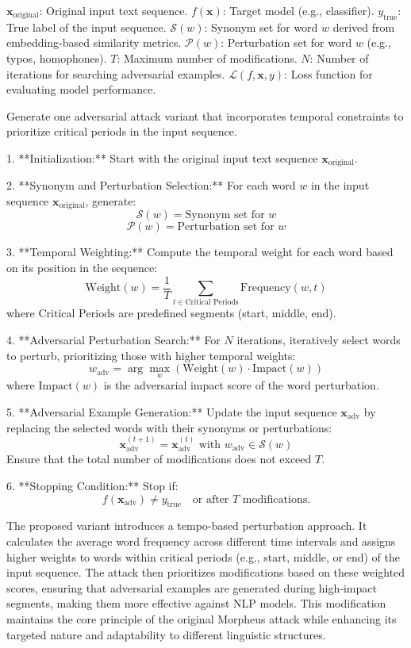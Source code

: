 $\mathbf{x}_{\text{original}}$: Original input text sequence.  
$f(\mathbf{x})$: Target model (e.g., classifier).  
$y_{\text{true}}$: True label of the input sequence.  
$\mathcal{S}(w)$: Synonym set for word $w$ derived from embedding-based similarity metrics.  
$\mathcal{P}(w)$: Perturbation set for word $w$ (e.g., typos, homophones).  
$T$: Maximum number of modifications.  
$N$: Number of iterations for searching adversarial examples.  
$\mathcal{L}(f, \mathbf{x}, y)$: Loss function for evaluating model performance.

Generate one adversarial attack variant that incorporates temporal constraints to prioritize critical periods in the input sequence.


1. **Initialization:** Start with the original input text sequence $\mathbf{x}_{\text{original}}$.

2. **Synonym and Perturbation Selection:** For each word $w$ in the input sequence $\mathbf{x}_{\text{original}}$, generate:
   \[
   \mathcal{S}(w) = \text{Synonym set for } w
   \]
   \[
   \mathcal{P}(w) = \text{Perturbation set for } w
   \]

3. **Temporal Weighting:** Compute the temporal weight for each word based on its position in the sequence:
   \[
   \text{Weight}(w) = \frac{1}{T} \sum_{t \in \text{Critical Periods}} \text{Frequency}(w, t)
   \]
   where $\text{Critical Periods}$ are predefined segments (start, middle, end).

4. **Adversarial Perturbation Search:** For $N$ iterations, iteratively select words to perturb, prioritizing those with higher temporal weights:
   \[
   w_{\text{adv}} = \arg\max_{w} \left(\text{Weight}(w) \cdot \text{Impact}(w)\right)
   \]
   where $\text{Impact}(w)$ is the adversarial impact score of the word perturbation.

5. **Adversarial Example Generation:** Update the input sequence $\mathbf{x}_{\text{adv}}$ by replacing the selected words with their synonyms or perturbations:
   \[
   \mathbf{x}_{\text{adv}}^{(t+1)} = \mathbf{x}_{\text{adv}}^{(t)} \text{ with } w_{\text{adv}} \in \mathcal{S}(w)
   \]
   Ensure that the total number of modifications does not exceed $T$.

6. **Stopping Condition:** Stop if:
   \[
   f(\mathbf{x}_{\text{adv}}) \neq y_{\text{true}} \quad \text{or after $T$ modifications.}
   \]



The proposed variant introduces a tempo-based perturbation approach. It calculates the average word frequency across different time intervals and assigns higher weights to words within critical periods (e.g., start, middle, or end) of the input sequence. The attack then prioritizes modifications based on these weighted scores, ensuring that adversarial examples are generated during high-impact segments, making them more effective against NLP models. This modification maintains the core principle of the original Morpheus attack while enhancing its targeted nature and adaptability to different linguistic structures.